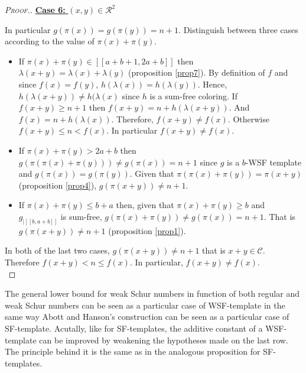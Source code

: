 \begin{proof}[\textsc{Proof.}]
\noindent \underline{\textbf{Case 6:} \((x,y) \in \mathcal{R}^2\)}
\par
In particular \(g(\pi(x)) = g(\pi(y))=n + 1\). Distinguish between three cases according to the value of \(\pi(x) + \pi(y)\).
\begin{itemize}
\item If \(\pi(x) + \pi(y) \in [\![a + b + 1, 2 a + b]\!]\) then \(\lambda(x + y) = \lambda(x) + \lambda(y)\) 
	(proposition \ref{prop7}). By definition of \(f\) and since \(f(x) = f(y)\), \(h(\lambda(x)) = h(\lambda(y))\).
	Hence, \(h(\lambda(x + y)) \neq h(\lambda(x)\) since \(h\) is a sum-free coloring. If \(f(x+y) \geqslant n + 1\) 
	then \(f(x + y) = n + h(\lambda(x + y))\). And \(f(x) = n + h(\lambda(x))\). Therefore, \(f(x + y)  \neq f(x)\). 
	Otherwise \(f(x+y) \leqslant n < f(x)\). In particular \(f(x + y) \neq f(x)\).
\item If \(\pi(x)+\pi(y)>2a+b\) then \(g(\pi(\pi(x)+\pi(y))) \neq g(\pi(x)) = n + 1\) since \(g\) is a \(b\)-WSF template and 
	\(g(\pi(x)) = g(\pi(y))\). Given that \(\pi(\pi(x)+\pi(y)) = \pi(x+y)\) (proposition \ref{prop4}), \(g(\pi(x+y)) \neq n + 1\).
\item \begin{sloppypar}
	If \(\pi(x)+\pi(y)\leqslant b+a\) then, given that \(\pi(x)+\pi(y) \geqslant b\) and \(g_{| [\![b, a + b ]\!]}\) is 
	sum-free, \({g(\pi(x) + \pi(y)) \neq g(\pi(x)) = n + 1}\). That is \({g(\pi(x + y)) \neq n + 1}\) (proposition \ref{prop1}).
	\end{sloppypar}
\end{itemize}
\par
In both of the last two cases, \({g(\pi(x + y)) \neq n + 1}\) that is \(x+y \in \mathcal{C}\). Therefore \(f(x+y) < n \leqslant f(x)\). 
In particular, \(f(x + y) \neq f(x)\). \\
\end{proof}

The general lower bound for weak Schur numbers in function of both regular and weak Schur numbers can be seen as a particular
case of WSF-template in the same way Abott and Hanson's construction can be seen as a particular case of SF-template. Acutally,
like for SF-templates, the additive constant of a WSF-template can be improved by weakening the hypotheses made on
the last row. The principle behind it is the same as in the analogous proposition for SF-templates.

